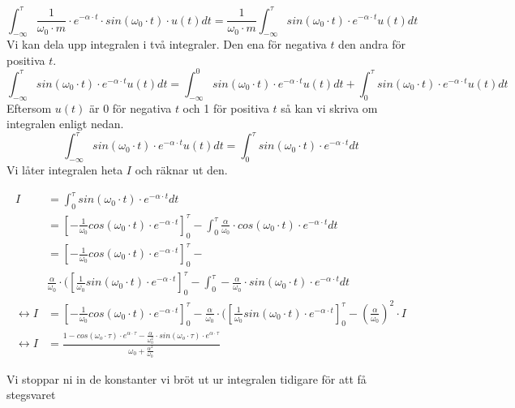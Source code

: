 \documentclass[10pt,a4paper]{article}
\begin{document}
\begin{equation}
\int_{-\infty}^\tau \frac{1} {\omega_0 \cdot m} \cdot e^{-\alpha \cdot t} \cdot sin(\omega_0 \cdot t) \cdot u(t) dt = \frac{1}{\omega_0 \cdot m} \int_{-\infty}^\tau sin(\omega_0 \cdot t)\cdot e^{-\alpha \cdot t} u(t) dt
\end{equation}
Vi kan dela upp integralen i två integraler. Den ena för negativa $t$ den andra för positiva $t$.
$$ \int_{-\infty}^\tau sin(\omega_0 \cdot t)\cdot e^{-\alpha \cdot t} u(t) dt
= \int_{-\infty}^0 sin(\omega_0 \cdot t)\cdot e^{-\alpha \cdot t} u(t) dt + \int_0^\tau sin(\omega_0 \cdot t)\cdot e^{-\alpha \cdot t} u(t) dt $$
Eftersom $u(t)$ är 0 för negativa $t$ och 1 för positiva $t$ så kan vi skriva om integralen enligt nedan.
\begin{equation}
\int_{-\infty}^\tau sin(\omega_0 \cdot t)\cdot e^{-\alpha \cdot t} u(t) dt
= \int_0^\tau sin(\omega_0 \cdot t)\cdot e^{-\alpha \cdot t} dt
\end{equation}
Vi låter integralen heta $I$ och räknar ut den.

\begin{equation}
\begin{split} 
I & = \int_0^\tau sin(\omega_0 \cdot t)\cdot e^{-\alpha \cdot t} dt  \\
& = [-\frac{1}{\omega_0} cos(\omega_0 \cdot t) \cdot e^{-\alpha \cdot t}]_0^\tau - \int_0^\tau \frac{\alpha}{\omega_0} \cdot cos(\omega_0 \cdot t) \cdot e^{-\alpha \cdot t} dt \\
& = [-\frac{1}{\omega_0} cos(\omega_0 \cdot t) \cdot e^{-\alpha \cdot t}]_0^\tau - \\
& \frac{\alpha}{\omega_0} \cdot ([\frac{1}{\omega_0} sin(\omega_0 \cdot t) \cdot e^{-\alpha \cdot t}]_0^\tau - \int_0^\tau -\frac{\alpha}{\omega_0} \cdot sin(\omega_0 \cdot t)\cdot e^{-\alpha \cdot t} dt \\
\leftrightarrow
I & = [-\frac{1}{\omega_0} cos(\omega_0 \cdot t) \cdot e^{-\alpha \cdot t}]_0^\tau - \frac{\alpha}{\omega_0} \cdot ([\frac{1}{\omega_0} sin(\omega_0 \cdot t) \cdot e^{-\alpha \cdot t}]_0^\tau - (\frac{\alpha}{\omega_0})^2 \cdot I \\
\leftrightarrow I & = \frac{1-cos(\omega_o \cdot \tau) \cdot e^{\alpha \cdot \tau} - \frac{\alpha}{\omega_0^2} \cdot sin(\omega_o \cdot \tau) \cdot e^{\alpha \cdot \tau}}{\omega_0 + \frac{\alpha^2}{\omega_0}}
\end{split}
\end{equation}

Vi stoppar ni in de konstanter vi bröt ut ur integralen tidigare för att få stegsvaret
\end{document}
